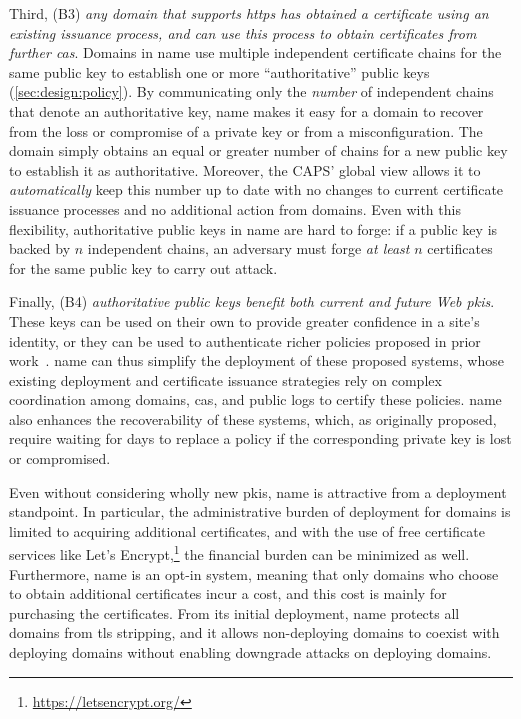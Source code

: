 Third, (B3) \emph{any domain that supports \ac{https} has obtained a certificate
using an existing issuance process, and can use this process to obtain
certificates from further \acp{ca}}. Domains in \ac{name} use multiple
independent certificate chains for the same public key to establish one or more
``authoritative'' public keys (\autoref{sec:design:policy}). By communicating
only the \emph{number} of independent chains that denote an authoritative key,
\ac{name} makes it easy for a domain to recover from the loss or compromise of a
private key or from a misconfiguration. The domain simply obtains an equal or
greater number of chains for a new public key to establish it as authoritative.
Moreover, the CAPS' global view allows it to
\emph{automatically} keep this number up to date with no changes to current
certificate issuance processes and no additional action from domains. Even with
this flexibility, authoritative public keys in \ac{name} are hard to forge: if a
public key is backed by $n$ independent chains, an adversary must forge \emph{at
least} $n$ certificates for the same public key to carry out  attack.

Finally, (B4) \emph{authoritative public keys benefit both current and future Web
\acp{pki}}. These keys can be used on their own to provide greater confidence in
a site's identity, or they can be used to authenticate richer policies
proposed in prior work~\cite{basin2014arpki, szalachowski2014policert}.
\ac{name} can thus simplify the deployment of these proposed systems, whose
existing deployment and certificate issuance strategies rely on complex
coordination among domains, \acp{ca}, and public logs to certify these policies.
\ac{name} also enhances the recoverability of these systems, which, as
originally proposed, require waiting for days to replace a policy if the
corresponding private key is lost or compromised.

Even without considering wholly new \acp{pki}, \ac{name} is attractive from a
deployment standpoint. In particular, the administrative burden of deployment
for domains is limited to acquiring additional certificates, and with the use of
free certificate services like Let's
Encrypt,\footnote{\url{https://letsencrypt.org/}} the financial burden can be
minimized as well. Furthermore, \ac{name} is an opt-in system, meaning that only
domains who choose to obtain additional certificates incur a cost, and this cost
is mainly for purchasing the certificates. From its initial deployment,
\ac{name} protects all domains from \ac{tls} stripping, and it allows
non-deploying domains to coexist with deploying domains without enabling
downgrade attacks on deploying domains.


